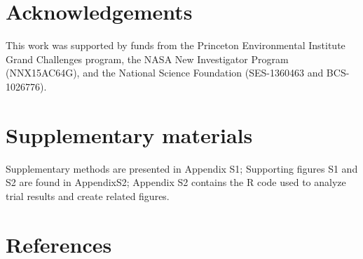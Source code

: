 \documentclass[preprint,12pt,authoryear]{elsarticle}
\begin{document}
\section*{Acknowledgements}
This work was supported by funds from the Princeton Environmental Institute Grand Challenges program, the NASA New Investigator Program (NNX15AC64G), and the National Science Foundation (SES-1360463 and BCS-1026776).   

\section*{Supplementary materials}
Supplementary methods are presented in Appendix S1; Supporting figures S1 and S2 are found in AppendixS2; Appendix S2 contains the R code used to analyze trial results and create related figures. 




\section*{References}
 



%
%
%
\end{document}
